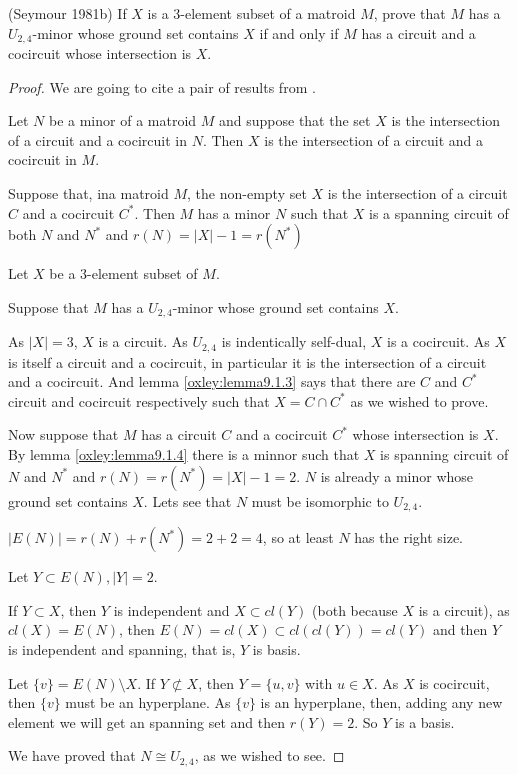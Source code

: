 \prob
{
    (Seymour 1981b) If $X$ is a 3-element subset of a matroid $M$, prove that $M$ has a $U_{2,4}$-minor whose ground set
    contains $X$ if and only if $M$ has a circuit and a cocircuit whose intersection is $X$.
}
\begin{proof}
	We are going to cite a pair of results from \cite{Oxley}.
    
    \begin{lemma}\label{oxley:lemma9.1.3}
        Let $N$ be a minor of a matroid $M$ and suppose that the set $X$ is the intersection of a 
        circuit and a cocircuit in $N$. Then $X$ is the intersection of a circuit and a cocircuit in $M$.
    \end{lemma}
    
    \begin{lemma}\label{oxley:lemma9.1.4}
        Suppose that, ina matroid $M$, the non-empty set $X$ is the intersection of a circuit $C$ and a cocircuit $C^*$.
        Then $M$ has a minor $N$ such that $X$ is a spanning circuit of both $N$ and $N^*$ and $r(N) = |X| - 1 = r(N^*)$
    \end{lemma}
        
    Let $X$ be a 3-element subset of $M$.\pn
    
    Suppose that $M$ has a $U_{2,4}$-minor whose ground set contains $X$.\pn
    
    As $|X| = 3$, $X$ is a circuit. As $U_{2,4}$ is indentically self-dual, $X$ is a cocircuit. As
    $X$ is itself a circuit and a cocircuit, in particular it is the intersection of a circuit and a cocircuit. And lemma \ref{oxley:lemma9.1.3}
    says that there are $C$ and $C^*$ circuit and cocircuit respectively such that $X = C \cap C^*$ as we wished to prove.\pn
    
    Now suppose that $M$ has a circuit $C$ and a cocircuit $C^*$ whose intersection is $X$. By lemma \ref{oxley:lemma9.1.4} there is a minnor
    such that $X$ is spanning circuit of $N$ and $N^*$ and $r(N) = r(N^*) = |X| - 1 = 2$. $N$ is already a minor whose ground set contains
    $X$. Lets see that $N$ must be isomorphic to $U_{2,4}$.\pn 
    
    $|E(N)| = r(N) + r(N^*) = 2 + 2 = 4$, so at least $N$ has the right size.\pn
    
    Let $Y \subset E(N), |Y| = 2$.\pn 
    
    If $Y \subset X$, then $Y$ is independent and $X \subset cl(Y)$ (both because $X$ is a circuit), as $cl(X) = E(N)$,
    then $E(N) = cl(X) \subset cl(cl(Y)) = cl(Y)$ and then $Y$ is independent and spanning, that is, $Y$ is basis.\pn
    
    Let $\{ v \} = E(N) \setminus X$. If $Y \not\subset X$, then $Y = \{ u, v\}$ with $u \in X$. As $X$ is cocircuit, then $\{v\}$ must be
    an hyperplane. As $\{v\}$ is an hyperplane, then, adding any new element we will get an spanning set and then $r(Y) = 2$. So $Y$ is a
    basis.\pn
    
    We have proved that $N \cong U_{2,4}$, as we wished to see.
\end{proof}